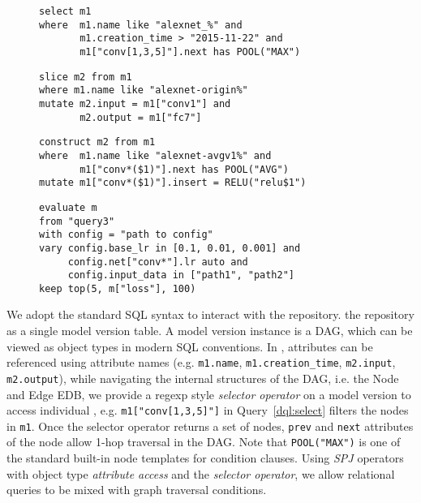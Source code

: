 \documentclass[conference]{IEEEtran}
\begin{document}
\begin{figure}
\begin{lstlisting}[caption={\DQL\ \cmd{select} query to pick the models.\quad\quad\quad\quad\quad\quad\quad\quad\quad\quad\quad}, label=dql:select]
select m1
where  m1.name like "alexnet_%" and
       m1.creation_time > "2015-11-22" and
       m1["conv[1,3,5]"].next has POOL("MAX")
\end{lstlisting}


\begin{lstlisting}[caption={\DQL\ \cmd{slice} query to get a sub-network.\quad\quad\quad\quad\quad\quad\quad\quad\quad\quad}, label=dql:slice]
slice m2 from m1
where m1.name like "alexnet-origin%"
mutate m2.input = m1["conv1"] and
       m2.output = m1["fc7"]
\end{lstlisting}

\begin{lstlisting}[caption={\DQL\ \cmd{construct} query to derive more models on existing ones.\quad}, label=dql:construct]
construct m2 from m1
where  m1.name like "alexnet-avgv1%" and 
       m1["conv*($1)"].next has POOL("AVG")
mutate m1["conv*($1)"].insert = RELU("relu$1")
\end{lstlisting}


\begin{lstlisting}[caption={\DQL\ \cmd{evaluate} query to enumerate models with different network architectures, search hyper-parameters, and eliminate models.}, label=dql:eval]
evaluate m
from "query3"
with config = "path to config"
vary config.base_lr in [0.1, 0.01, 0.001] and
     config.net["conv*"].lr auto and
     config.input_data in ["path1", "path2"]
keep top(5, m["loss"], 100)
\end{lstlisting}
\end{figure}


We adopt the standard SQL syntax to interact with the repository. \DQL\views
the repository as a single model version table. A model
version instance is a DAG, which can be viewed as object types in modern SQL conventions. In \DQL,
         attributes can be referenced using attribute names (e.g. \verb|m1.name|,
                \verb|m1.creation_time|, \verb|m2.input|, \verb|m2.output|), while navigating the
        internal structures of the DAG, i.e. the Node and Edge EDB, we provide a regexp style
        \emph{selector operator} on a model version to access individual \dnn\nodes{}, e.g. 
        \verb|m1["conv[1,3,5]"]| in Query~\ref{dql:select} filters the nodes in \verb|m1|. %
        Once the selector operator returns a set of nodes, \verb|prev| and \verb|next| attributes of
        the node allow 1-hop traversal in the DAG. Note that \verb|POOL("MAX")| is one of the
        standard built-in node templates for condition clauses. Using \emph{SPJ} operators with
        object type \emph{attribute access} and the \emph{selector operator}, we allow 
        relational queries to be mixed with graph traversal conditions.
\end{document}
